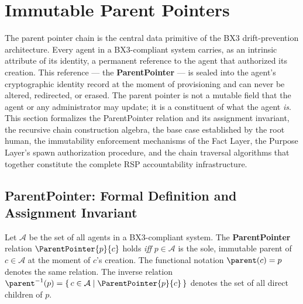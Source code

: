 
\section{Immutable Parent Pointers}
\label{sec:immutable_parent_pointers}

The parent pointer chain is the central data primitive of the BX3 drift-prevention architecture. Every agent in a BX3-compliant system carries, as an intrinsic attribute of its identity, a permanent reference to the agent that authorized its creation. This reference — the \textbf{ParentPointer} — is sealed into the agent's cryptographic identity record at the moment of provisioning and can never be altered, redirected, or erased. The parent pointer is not a mutable field that the agent or any administrator may update; it is a constituent of what the agent \emph{is}. This section formalizes the ParentPointer relation and its assignment invariant, the recursive chain construction algebra, the base case established by the root human, the immutability enforcement mechanisms of the Fact Layer, the Purpose Layer's spawn authorization procedure, and the chain traversal algorithms that together constitute the complete RSP accountability infrastructure.

\subsection{ParentPointer: Formal Definition and Assignment Invariant}
\label{sec:parent_pointer_def}

\begin{definition}[ParentPointer]
\label{def:parent_pointer}
Let $\mathcal{A}$ be the set of all agents in a BX3-compliant system. The \textbf{ParentPointer} relation $\ParentPointer{p}{c}$ holds \emph{iff} $p \in \mathcal{A}$ is the sole, immutable parent of $c \in \mathcal{A}$ at the moment of $c$'s creation. The functional notation $\parent(c) = p$ denotes the same relation. The inverse relation $\parent^{-1}(p) = \{\, c \in \mathcal{A} \mid \ParentPointer{p}{c} \,\}$ denotes the set of all direct children of $p$.
\end{definition}

